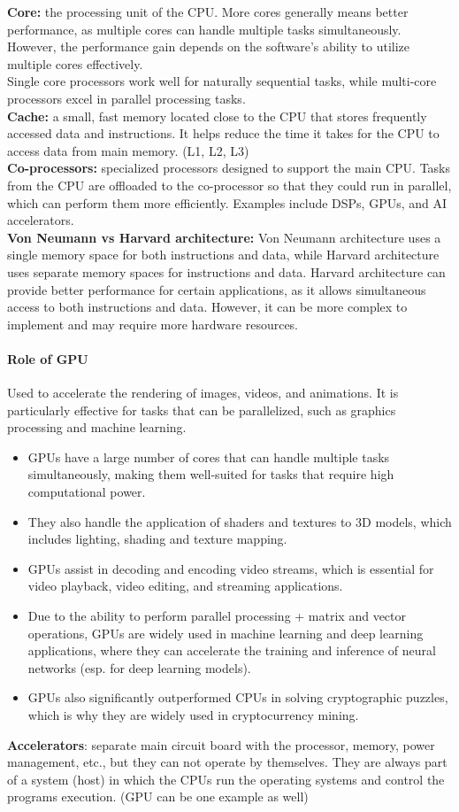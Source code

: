 \textbf{Core:} the processing unit of the CPU. More cores generally means better performance, as multiple cores can handle multiple tasks simultaneously. However, the performance gain depends on the software's ability to utilize multiple cores effectively.\\
Single core processors work well for naturally sequential tasks, while multi-core processors excel in parallel processing tasks.\\
\textbf{Cache:} a small, fast memory located close to the CPU that stores frequently accessed data and instructions. It helps reduce the time it takes for the CPU to access data from main memory. (L1, L2, L3)\\
\textbf{Co-processors:} specialized processors designed to support the main CPU. Tasks from the CPU are offloaded to the co-processor so that they could run in parallel, which can perform them more efficiently. Examples include DSPs, GPUs, and AI accelerators.\\
\textbf{Von Neumann vs Harvard architecture:} Von Neumann architecture uses a single memory space for both instructions and data, while Harvard architecture uses separate memory spaces for instructions and data. Harvard architecture can provide better performance for certain applications, as it allows simultaneous access to both instructions and data. However, it can be more complex to implement and may require more hardware resources.
\paragraph{Role of GPU}
Used to accelerate the rendering of images, videos, and animations. It is particularly effective for tasks that can be parallelized, such as graphics processing and machine learning. 
\begin{itemize}
    \item GPUs have a large number of cores that can handle multiple tasks simultaneously, making them well-suited for tasks that require high computational power.
    \item They also handle the application of shaders and textures to 3D models, which includes lighting, shading and texture mapping. 
    \item GPUs assist in decoding and encoding video streams, which is essential for video playback, video editing, and streaming applications.
    \item Due to the ability to perform parallel processing + matrix and vector operations, GPUs are widely used in machine learning and deep learning applications, where they can accelerate the training and inference of neural networks (esp. for deep learning models).
    \item GPUs also significantly outperformed CPUs in solving cryptographic puzzles, which is why they are widely used in cryptocurrency mining.
\end{itemize} 
\textbf{Accelerators}: separate main circuit board with the processor, memory, power management, etc., but they can not operate by themselves. They are always part of a system (host) in which the CPUs run the operating systems and control the programs execution. (GPU can be one example as well)
